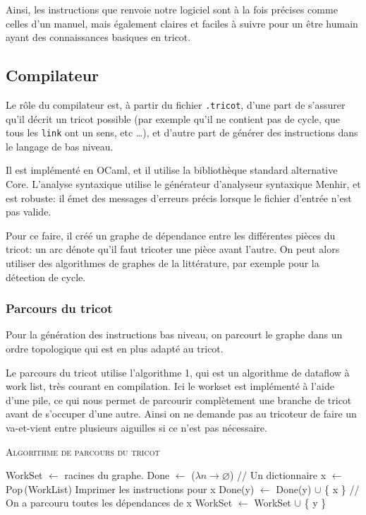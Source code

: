 \documentclass{article}
\begin{document}

Ainsi, les instructions que renvoie notre logiciel sont à la fois précises comme celles d'un manuel, mais 
également claires et faciles à suivre pour un être humain ayant des connaissances basiques en tricot. 

\subsection{Compilateur} %

Le rôle du compilateur est, à partir du fichier \texttt{.tricot}, d'une part de 
s'assurer qu'il décrit un tricot possible (par exemple qu'il ne contient
pas de cycle, que tous les \texttt{link} ont un sens, etc \dots), et 
d'autre part de générer des instructions  dans le langage de bas niveau.

Il est implémenté en OCaml, et il utilise la bibliothèque standard alternative
Core. L'analyse syntaxique utilise le générateur d'analyseur syntaxique Menhir,
et est robuste: il émet des messages d'erreurs précis lorsque le fichier d'entrée 
n'est pas valide.

Pour ce faire, il créé un graphe de dépendance entre les différentes pièces
du tricot: un arc dénote qu'il faut tricoter une pièce avant l'autre. On peut
alors utiliser des algorithmes de graphes de la littérature, par exemple pour 
la détection de cycle.

\subsubsection{Parcours du tricot}

Pour la génération des instructions bas niveau, on parcourt le graphe 
dans un ordre topologique qui est en plus adapté au tricot.

Le parcours du tricot utilise l'algorithme 1, qui est un algorithme de
dataflow à work list, très courant en compilation. Ici le workset est
implémenté à l'aide d'une pile, ce qui nous permet de parcourir
complètement une branche de tricot avant de s'occuper d'une
autre. Ainsi on ne demande pas au tricoteur de faire un va-et-vient
entre plusieurs aiguilles si ce n'est pas nécessaire.

\begin{algorithm}\label{algo}
\caption{\textsc{Algorithme de parcours du tricot}}
\begin{algorithmic}[1]
\State WorkSet $\leftarrow$ racines du graphe.
\State Done $\leftarrow$ ($\lambda n \to \varnothing$) // Un dictionnaire
  \State x $\leftarrow$ Pop\,(WorkList)
  \State Imprimer les instructions pour x
    \State Done(y) $\leftarrow$ Done(y) $\cup$ \{ x \}
     // On a parcouru toutes les dépendances de x
      \State WorkSet $\leftarrow$ WorkSet $\cup$ \{ y \}
    \EndIf
  \EndFor
\EndWhile
\end{algorithmic}
\end{algorithm}
\end{document}
